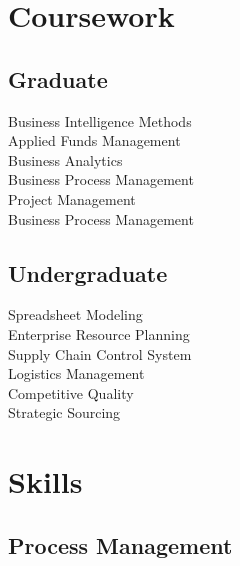 \documentclass[letterpaper]{deedy-resume} %
\begin{document}
\begin{minipage}[t]{0.33\textwidth}
\sectionspace %



\section{Coursework}

\subsection{Graduate}

Business Intelligence Methods \\
Applied Funds Management \\
Business Analytics \\
Business Process Management \\
Project Management \\
Business Process Management\\

\sectionspace %


\subsection{Undergraduate}

Spreadsheet Modeling\\
Enterprise Resource Planning \\
Supply Chain Control System \\
Logistics Management \\
Competitive Quality \\
Strategic Sourcing\\


\sectionspace %



\section{Skills}

\subsection{Process Management}


\end{minipage}
\end{document}

